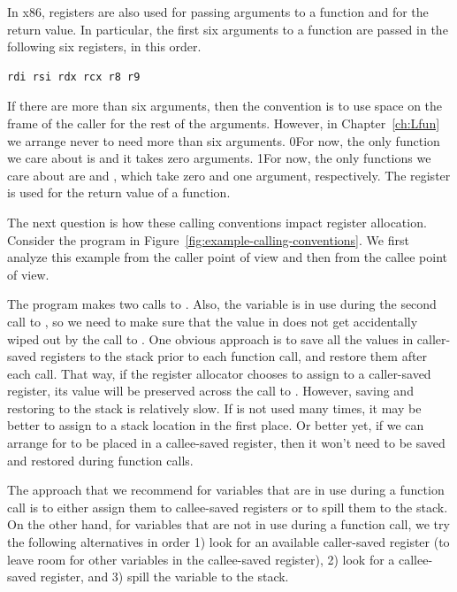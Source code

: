 \documentclass[7x10,nocrop]{TimesAPriori_MIT}%
\def\racketEd{0}
\def\pythonEd{1}
\def\edition{1}
\newcommand{\racket}[1]{{\if\edition\racketEd{#1}\fi}}
\newcommand{\python}[1]{{\if\edition\pythonEd #1\fi}}
\begin{document}
In x86, registers are also used for passing arguments to a function
and for the return value.  In particular, the first six arguments to a
function are passed in the following six registers, in this order.
\begin{lstlisting}
rdi rsi rdx rcx r8 r9
\end{lstlisting}
If there are more than six arguments, then the convention is to use
space on the frame of the caller for the rest of the
arguments. However, in Chapter~\ref{ch:Lfun} we arrange never to
need more than six arguments.
%
\racket{For now, the only function we care about is 
  and it takes zero arguments.}
%
\python{For now, the only functions we care about are \code{read\_int}
  and \code{print\_int}, which take zero and one argument, respectively.}
%
The register  is used for the return value of a function.

The next question is how these calling conventions impact register
allocation. Consider the \LangVar{} program in
Figure~\ref{fig:example-calling-conventions}.  We first analyze this
example from the caller point of view and then from the callee point
of view.

The program makes two calls to \READOP{}.  Also, the variable 
is in use during the second call to \READOP{}, so we need to make sure
that the value in  does not get accidentally wiped out by the
call to \READOP{}.  One obvious approach is to save all the values in
caller-saved registers to the stack prior to each function call, and
restore them after each call. That way, if the register allocator
chooses to assign  to a caller-saved register, its value will
be preserved across the call to \READOP{}.  However, saving and
restoring to the stack is relatively slow. If  is not used
many times, it may be better to assign  to a stack location in
the first place. Or better yet, if we can arrange for  to be
placed in a callee-saved register, then it won't need to be saved and
restored during function calls.

The approach that we recommend for variables that are in use during a
function call is to either assign them to callee-saved registers or to
spill them to the stack. On the other hand, for variables that are not
in use during a function call, we try the following alternatives in
order 1) look for an available caller-saved register (to leave room
for other variables in the callee-saved register), 2) look for a
callee-saved register, and 3) spill the variable to the stack.
\end{document}
